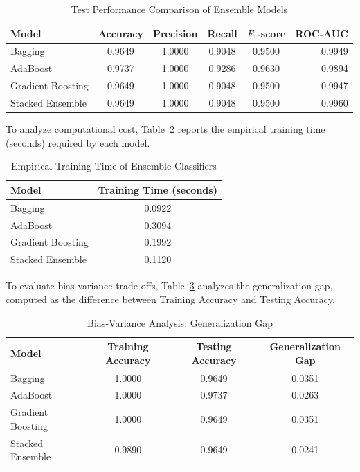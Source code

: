 \documentclass[12pt,a4paper]{article}
\begin{document}
\begin{table}[H]
\centering
\caption{Test Performance Comparison of Ensemble Models}
\label{tab:test_results}
\vspace{0.2cm}
\begin{tabular}{lccccr}
\toprule
\textbf{Model} & \textbf{Accuracy} & \textbf{Precision} & \textbf{Recall} & \textbf{$F_1$-score} & \textbf{ROC-AUC} \\
\midrule
Bagging & 0.9649 & 1.0000 & 0.9048 & 0.9500 & 0.9949 \\
AdaBoost & 0.9737 & 1.0000 & 0.9286 & 0.9630 & 0.9894 \\
Gradient Boosting & 0.9649 & 1.0000 & 0.9048 & 0.9500 & 0.9947 \\
Stacked Ensemble & 0.9649 & 1.0000 & 0.9048 & 0.9500 & 0.9960 \\
\bottomrule
\end{tabular}
\end{table}

To analyze computational cost, Table~\ref{tab:training_times} reports the empirical training time (seconds) required by each model.

\begin{table}[H]
\centering
\caption{Empirical Training Time of Ensemble Classifiers}
\label{tab:training_times}
\vspace{0.2cm}
\begin{tabular}{lc}
\toprule
\textbf{Model} & \textbf{Training Time (seconds)} \\
\midrule
Bagging & 0.0922 \\
AdaBoost & 0.3094 \\
Gradient Boosting & 0.1992 \\
Stacked Ensemble & 0.1120 \\
\bottomrule
\end{tabular}
\end{table}

To evaluate bias-variance trade-offs, Table~\ref{tab:generalization} analyzes the generalization gap, computed as the difference between Training Accuracy and Testing Accuracy.

\begin{table}[H]
\centering
\caption{Bias-Variance Analysis: Generalization Gap}
\label{tab:generalization}
\vspace{0.2cm}
\begin{tabular}{lccc}
\toprule
\textbf{Model} & \textbf{Training Accuracy} & \textbf{Testing Accuracy} & \textbf{Generalization Gap} \\
\midrule
Bagging & 1.0000 & 0.9649 & 0.0351 \\
AdaBoost & 1.0000 & 0.9737 & 0.0263 \\
Gradient Boosting & 1.0000 & 0.9649 & 0.0351 \\
Stacked Ensemble & 0.9890 & 0.9649 & 0.0241 \\
\bottomrule
\end{tabular}
\end{table}
\end{document}
